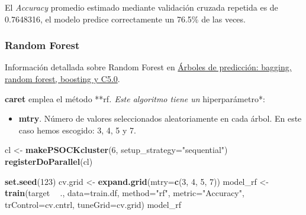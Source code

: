 \documentclass[]{article}
\newenvironment{Shaded}{\begin{snugshade}}{\end{snugshade}}
\newcommand{\DataTypeTok}[1]{\textcolor[rgb]{0.13,0.29,0.53}{#1}}
\newcommand{\DecValTok}[1]{\textcolor[rgb]{0.00,0.00,0.81}{#1}}
\newcommand{\KeywordTok}[1]{\textcolor[rgb]{0.13,0.29,0.53}{\textbf{#1}}}
\newcommand{\NormalTok}[1]{#1}
\newcommand{\OperatorTok}[1]{\textcolor[rgb]{0.81,0.36,0.00}{\textbf{#1}}}
\newcommand{\StringTok}[1]{\textcolor[rgb]{0.31,0.60,0.02}{#1}}
\providecommand{\tightlist}{%
  \setlength{\itemsep}{0pt}\setlength{\parskip}{0pt}}
\begin{document}
El \emph{Accuracy} promedio estimado mediante validación cruzada
repetida es de 0.7648316, el modelo predice correctamente un 76.5\% de
las veces.

\hypertarget{random-forest}{%
\subsubsection{Random Forest}\label{random-forest}}

Información detallada sobre Random Forest en
\href{https://www.cienciadedatos.net/documentos/33_arboles_de_prediccion_bagging_random_forest_boosting}{Árboles
de predicción: bagging, random forest, boosting y C5.0}.

\textbf{caret} emplea el método **rf\emph{. Este algoritmo tiene un
}hiperparámetro*:

\begin{itemize}
\tightlist
\item
  \textbf{mtry}. Número de valores seleccionados aleatoriamente en cada
  árbol. En este caso hemos escogido: 3, 4, 5 y 7.
\end{itemize}

\begin{Shaded}
\begin{Highlighting}[]
\NormalTok{cl <-}\StringTok{ }\KeywordTok{makePSOCKcluster}\NormalTok{(}\DecValTok{6}\NormalTok{, }\DataTypeTok{setup_strategy=}\StringTok{"sequential"}\NormalTok{)}
\KeywordTok{registerDoParallel}\NormalTok{(cl)}
\end{Highlighting}
\end{Shaded}

\begin{Shaded}
\begin{Highlighting}[]
\KeywordTok{set.seed}\NormalTok{(}\DecValTok{123}\NormalTok{)}
\NormalTok{cv.grid <-}\StringTok{ }\KeywordTok{expand.grid}\NormalTok{(}\DataTypeTok{mtry=}\KeywordTok{c}\NormalTok{(}\DecValTok{3}\NormalTok{, }\DecValTok{4}\NormalTok{, }\DecValTok{5}\NormalTok{, }\DecValTok{7}\NormalTok{))}
\NormalTok{model_rf <-}\StringTok{ }\KeywordTok{train}\NormalTok{(target }\OperatorTok{~}\StringTok{ }\NormalTok{., }\DataTypeTok{data=}\NormalTok{train.df,}
                      \DataTypeTok{method=}\StringTok{"rf"}\NormalTok{,}
                      \DataTypeTok{metric=}\StringTok{"Accuracy"}\NormalTok{,}
                      \DataTypeTok{trControl=}\NormalTok{cv.cntrl,}
                      \DataTypeTok{tuneGrid=}\NormalTok{cv.grid)}
\NormalTok{model_rf}
\end{Highlighting}
\end{Shaded}
\end{document}
